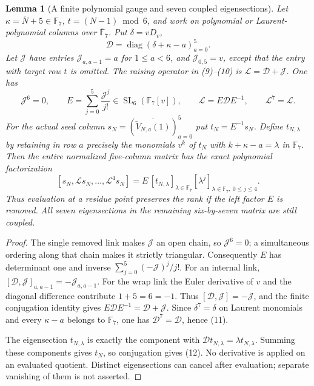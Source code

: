 \documentclass[11pt]{article}
\newtheorem{lemma}{Lemma}\newtheorem{theorem}[lemma]{Theorem}\newtheorem{corollary}[lemma]{Corollary}\newtheorem{proposition}[lemma]{Proposition}
\begin{document}
\begin{lemma}[A finite polynomial gauge and seven coupled eigensections]
\label{lem:gauge}
Let $\kappa=\bar N+5\in\mathbb F_7$, $t=(N-1)\bmod6$, and
work on polynomial or Laurent-polynomial columns over
$\overline{\mathbb F}_7$. Put $\delta=vD_v$,
\[
 \mathcal D=\operatorname{diag}(\delta+\kappa-a)_{a=0}^5.
\]
Let $\mathcal J$ have entries $\mathcal J_{a,a-1}=a$
for $1\le a<6$, and $\mathcal J_{0,5}=v$, except that the
entry with target row $t$ is omitted.
The raising operator in (9)--(10) is
$\mathcal L=\mathcal D+\mathcal J$. One has
\[
 \mathcal J^6=0,\qquad
 E=\sum_{j=0}^5\frac{\mathcal J^j}{j!}\in
              \operatorname{SL}_6(\mathbb F_7[v]),\qquad
 \mathcal L=E\mathcal D E^{-1},\qquad
 \mathcal L^7=\mathcal L.                              \tag{11}
\]
For the actual seed column
$s_N=(\overline{\widetilde V_{N,a}(1)})_{a=0}^5$ put
$t_N=E^{-1}s_N$. Define $t_{N,\lambda}$ by retaining in
row $a$ precisely the monomials $v^k$ of $t_N$ with
$k+\kappa-a=\lambda$ in $\mathbb F_7$.
Then the entire normalized five-column matrix has the exact
polynomial factorization
\[
 [s_N,\mathcal Ls_N,\ldots,\mathcal L^4s_N]
  =E\,[t_{N,\lambda}]_{\lambda\in\mathbb F_7}
                  [\lambda^j]_{\lambda\in\mathbb F_7,\ 0\le j\le4}.
                                                               \tag{12}
\]
Thus evaluation at a residue point preserves the rank if the
left factor $E$ is removed. All seven eigensections in the
remaining six-by-seven matrix are still coupled.
\end{lemma}
\begin{proof}
The single removed link makes $\mathcal J$ an open chain,
so $\mathcal J^6=0$; a simultaneous ordering along that chain
makes it strictly triangular. Consequently $E$ has determinant
one and inverse $\sum_{j=0}^5(-\mathcal J)^j/j!$.
For an internal link,
$[\mathcal D,\mathcal J]_{a,a-1}=-\mathcal J_{a,a-1}$.
For the wrap link the Euler derivative of $v$ and the diagonal
difference contribute $1+5=6=-1$. Thus
$[\mathcal D,\mathcal J]=-\mathcal J$, and the finite
conjugation identity gives
$E\mathcal D E^{-1}=\mathcal D+\mathcal J$.
Since $\delta^7=\delta$ on Laurent monomials and every
$\kappa-a$ belongs to $\mathbb F_7$, one has
$\mathcal D^7=\mathcal D$, hence (11).

The eigensection $t_{N,\lambda}$ is exactly the component
with $\mathcal D t_{N,\lambda}=\lambda t_{N,\lambda}$.
Summing these components gives $t_N$, so conjugation gives
(12). No derivative is applied on an evaluated quotient.
Distinct eigensections can cancel after evaluation; separate
vanishing of them is not asserted.
\end{proof}
\end{document}
